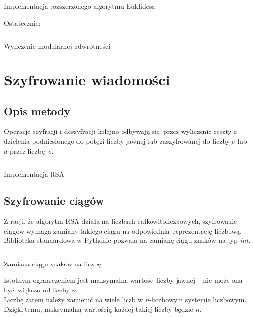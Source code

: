 \documentclass[12pt]{article}
\begin{document}
\begin{listing}[H]
	\inputminted[firstline=32,lastline=42]{python}{../rsa.py}
	\caption{Implementacja rozszerzonego algorytmu Euklidesa}
\end{listing}

Ostatecznie:

\begin{listing}[H]
	\inputminted[firstline=28,lastline=30]{python}{../rsa.py}
	\caption{Wyliczenie modularnej odwrotności}
\end{listing}

\section{Szyfrowanie wiadomości}

\subsection{Opis metody}
Operacje szyfracji i deszyfracji kolejno odbywają się przez
wyliczenie reszty z dzielenia
podniesionego do potęgi liczby jawnej lub zaszyfrowanej do
liczby $e$ lub $d$ 
przez liczbę $d$.

\begin{listing}[H]
	\inputminted[firstline=75,lastline=79]{python}{../rsa.py}
	\caption{Implementacja RSA}
\end{listing}

\newpage

\subsection{Szyfrowanie ciągów}

Z racji, że algorytm RSA działa na liczbach całkowitoliczbowych,
szyfrowanie ciągów wymaga zamiany takiego ciągu na odpowiednią reprezentację
liczbową.
\\

Biblioteka standardowa w Pythonie 
pozwala na zamianę ciągu znaków na typ \textit{int}.

\begin{listing}[H]
	\inputminted[]{python}{3-bytes-example.py}
	\caption{Zamiana ciągu znaków na liczbę}
\end{listing}

Istotnym ograniczeniem jest maksymalna wartość liczby jawnej -- nie może
ona być większa od liczby $n$.
\\

Liczbę zatem należy zamienić
na wiele liczb w $n$-liczbowym systemie liczbowym.
Dzięki temu, maksymalną wartością każdej takiej liczby będzie $n$.
\end{document}
